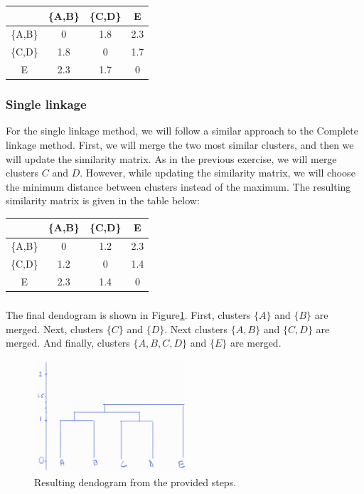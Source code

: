 \documentclass{article}
\begin{document}
\begin{center}
    \begin{tabular}{c|ccc}
          & \{A,B\} & \{C,D\} & E \\
    \hline
    \{A,B\} & 0     & 1.8   & 2.3 \\
    \{C,D\} & 1.8   & 0     & 1.7 \\
    E       & 2.3   & 1.7   & 0   \\
    \end{tabular}
\end{center}

\subsubsection{Single linkage}
For the single linkage method, we will follow a similar approach to the Complete linkage method. First, we will merge the two most similar clusters, and then we will update the similarity matrix. As in the previous exercise, we will merge clusters $C$ and $D$. However, while updating the similarity matrix, we will choose the minimum distance between clusters instead of the maximum. The resulting similarity matrix is given in the table below:

\begin{center}
    \begin{tabular}{c|ccc}
          & \{A,B\} & \{C,D\} & E \\
    \hline
    \{A,B\} & 0     & 1.2   & 2.3 \\
    \{C,D\} & 1.2   & 0     & 1.4 \\
    E       & 2.3   & 1.4   & 0   \\
    \end{tabular}
\end{center}

\subsubsection{}
The final dendogram is shown in Figure\ref{fig:dendogram}. First, clusters $\{A\}$ and $\{B\}$ are merged. Next, clusters $\{C\}$ and $\{D\}$. Next clusters $\{A, B\}$ and $\{C, D\}$ are merged. And finally, clusters $\{A, B, C, D\}$ and $\{E\}$ are merged.
\begin{figure}[h!]
    \centering
    \includegraphics[width=0.5\textwidth]{dendogram.png}
    \caption{Resulting dendogram from the provided steps.}
    \label{fig:dendogram}
\end{figure}

\clearpage

% 
% 

\end{document}
